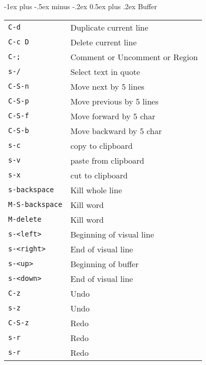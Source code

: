 \documentclass[10pt,landscape]{article}
\makeatletter
\renewcommand{\section}{\@startsection{section}{1}{0mm}%
                                {-1ex plus -.5ex minus -.2ex}%
                                {0.5ex plus .2ex}%
                                {\normalfont\large\bfseries}}
\makeatother
\begin{document}
\raggedright
\footnotesize
\begin{multicols}{3}


\setlength{\premulticols}{1pt}
\setlength{\postmulticols}{1pt}
\setlength{\multicolsep}{1pt}
\setlength{\columnsep}{2pt}


\section{Buffer}
\begin{tabular}{@{}ll@{}}
\verb!C-d!    & Duplicate current line \\
\verb!C-c D!    & Delete current line \\
\verb!C-;!    & Comment or Uncomment or Region \\
\verb!s-/!    & Select text in quote \\
\verb!C-S-n!    & Move next by 5 lines \\
\verb!C-S-p!    & Move previous by 5 lines \\
\verb!C-S-f!    & Move forward by 5 char \\
\verb!C-S-b!    & Move backward by 5 char \\
\verb!s-c!      & copy to clipboard \\
\verb!s-v!      & paste from clipboard \\
\verb!s-x!      & cut to clipboard \\
\verb!s-backspace!      & Kill whole line \\
\verb!M-S-backspace!    & Kill word \\
\verb!M-delete!          & Kill word \\
\verb!s-<left>!      & Beginning of visual line \\
\verb!s-<right>!     & End of visual line \\
\verb!s-<up>!        & Beginning of buffer \\
\verb!s-<down>!      & End of visual line \\
\verb!C-z!      & Undo \\
\verb!s-z!      & Undo \\
\verb!C-S-z!    & Redo \\
\verb!s-r!      & Redo \\
\verb!s-r!      & Redo
\end{tabular}


\end{multicols}
\end{document}
